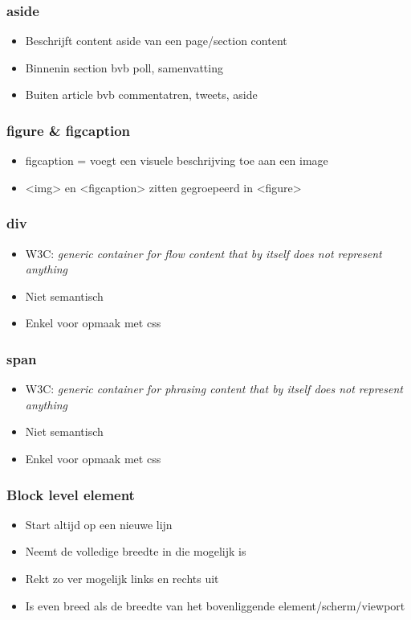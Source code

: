 \documentclass{article}
\begin{document}
\subsubsection{aside}
\begin{itemize}
    \item Beschrijft content aside van een page/section content
    \item Binnenin section bvb poll, samenvatting
    \item Buiten article bvb commentatren, tweets, aside
\end{itemize}

\subsubsection{figure \& figcaption}
\begin{itemize}
    \item figcaption = voegt een visuele beschrijving toe aan een image
    \item <img> en <figcaption> zitten gegroepeerd in <figure>
\end{itemize}

\subsubsection{div}{
    \begin{itemize}
        \item W3C: \textit{generic container for flow content that by itself does not represent anything}
        \item Niet semantisch
        \item Enkel voor opmaak met css
    \end{itemize}
}

\subsubsection{span}{
    \begin{itemize}
        \item W3C: \textit{generic container for phrasing content that by itself does not represent anything}
        \item Niet semantisch
        \item Enkel voor opmaak met css
    \end{itemize}
}

\subsubsection{Block level element}
\begin{itemize}
    \item Start altijd op een nieuwe lijn 
    \item Neemt de volledige breedte in die mogelijk is
    \item Rekt zo ver mogelijk links en rechts uit 
    \item Is even breed als de breedte van het bovenliggende element/scherm/viewport
\end{itemize}
\end{document}
